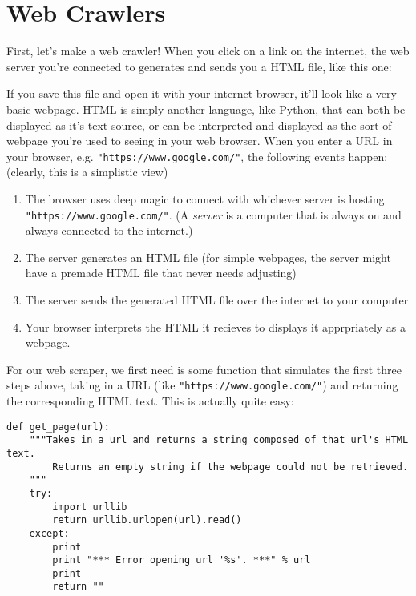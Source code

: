 \label{lab:Web_Scraping}

\section*{Web Crawlers}
First, let's make a web crawler! When you click on a link on the internet, the web server you're connected to generates and sends you a HTML file, like this one:


If you save this file and open it with your internet browser, it'll look like a very basic webpage. HTML is simply another language, like Python, that can both be displayed as it's text source, or can be interpreted and displayed as the sort of webpage you're used to seeing in your web browser. When you enter a URL in your browser, e.g. \texttt{"https://www.google.com/"}, the following events happen: (clearly, this is a simplistic view)
\begin{enumerate}
\item The browser uses deep magic to connect with whichever server is hosting \texttt{"https://www.google.com/"}. (A \emph{server} is a computer that is always on and always connected to the internet.)
\item The server generates an HTML file (for simple webpages, the server might have a premade HTML file that never needs adjusting)
\item The server sends the generated HTML file over the internet to your computer
\item Your browser interprets the HTML it recieves to displays it apprpriately as a webpage.
\end{enumerate}

For our web scraper, we first need is some function  that simulates the first three steps above, taking in a URL (like \texttt{"https://www.google.com/"}) and returning the corresponding HTML text. This is actually quite easy:
\begin{lstlisting}
def get_page(url):
    """Takes in a url and returns a string composed of that url's HTML text.
        Returns an empty string if the webpage could not be retrieved.
    """
    try:
        import urllib
        return urllib.urlopen(url).read()
    except:
        print
        print "*** Error opening url '%s'. ***" % url
        print
        return ""
\end{lstlisting}

